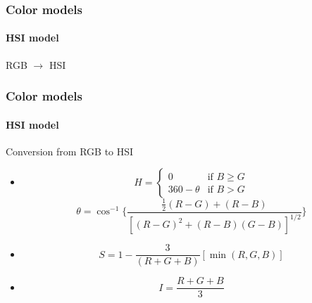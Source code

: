 \documentclass{beamer}
\begin{document}
\begin{frame}
\frametitle{Color models}
\framesubtitle{HSI model}
\begin{block}{RGB $\rightarrow$ HSI}
\end{block}
\end{frame}
\begin{frame}
\frametitle{Color models}
\framesubtitle{HSI model}
\begin{block}{Conversion from RGB to HSI}
\scriptsize{
\begin{itemize}
\item[] 
\[ H = 
\begin{cases} 
   	0 & \text{if } B \geq G \\
   	360-\theta & \text{if } B > G
  	\end{cases}
\]
\[
\theta = \cos^{-1}\lbrace\frac{\frac{1}{2}(R-G)+(R-B)}{[(R-G)^{2}+(R-B)(G-B)]^{1/2}}\rbrace
\]
\item[]
\[
S = 1 -\frac{3}{(R+G+B)}[\min(R,G,B)] 
\]
\item[]
\[
I = \frac{R+G+B}{3}
\]
\end{itemize}}
\end{block}
\end{frame}
\end{document}
